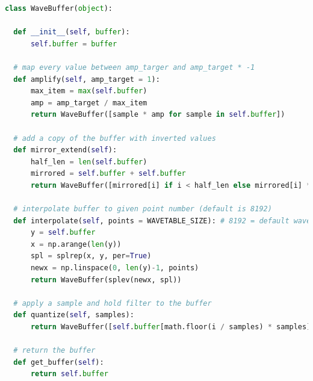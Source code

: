 \label{lst:wavebuffer}
\begin{lstlisting}[language=Python]
class WaveBuffer(object):

  def __init__(self, buffer):
      self.buffer = buffer

  # map every value between amp_targer and amp_target * -1
  def amplify(self, amp_target = 1):
      max_item = max(self.buffer)
      amp = amp_target / max_item
      return WaveBuffer([sample * amp for sample in self.buffer])

  # add a copy of the buffer with inverted values
  def mirror_extend(self):
      half_len = len(self.buffer)        
      mirrored = self.buffer + self.buffer
      return WaveBuffer([mirrored[i] if i < half_len else mirrored[i] * -1 for i in range(len(mirrored))])

  # interpolate buffer to given point number (default is 8192)
  def interpolate(self, points = WAVETABLE_SIZE): # 8192 = default wavetable size
      y = self.buffer
      x = np.arange(len(y))
      spl = splrep(x, y, per=True)
      newx = np.linspace(0, len(y)-1, points)
      return WaveBuffer(splev(newx, spl))

  # apply a sample and hold filter to the buffer
  def quantize(self, samples):
      return WaveBuffer([self.buffer[math.floor(i / samples) * samples] for i in range(len(self.buffer))])

  # return the buffer
  def get_buffer(self):
      return self.buffer
\end{lstlisting}



